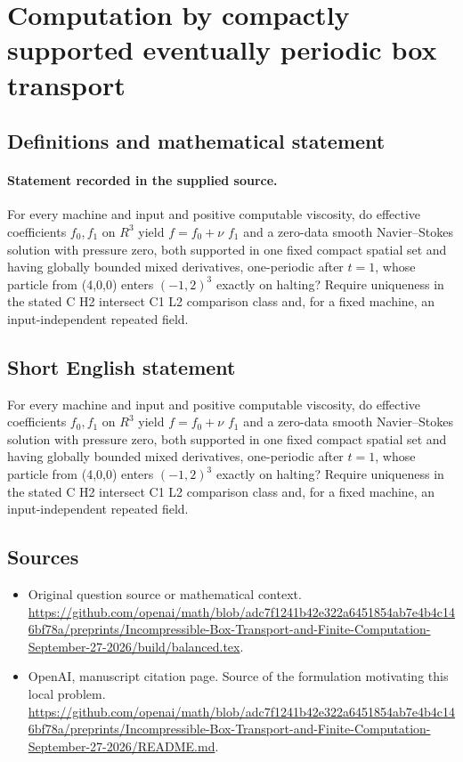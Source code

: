 \documentclass[11pt]{article}
\begin{document}
\section*{Computation by compactly supported eventually periodic box transport}\label{statement}
\subsection{Definitions and mathematical statement}
\paragraph{Statement recorded in the supplied source.}
For every machine and input and positive computable viscosity, do effective coefficients $f_0,f_1$ on $R^3$ yield $f=f_0+\nu $ $f_1$ and a zero-data smooth Navier–Stokes solution with pressure zero, both supported in one fixed compact spatial set and having globally bounded mixed derivatives, one-periodic after $t=1$, whose particle from (4,0,0) enters $(-1,2)^3$ exactly on halting? Require uniqueness in the stated C H2 intersect C1 L2 comparison class and, for a fixed machine, an input-independent repeated field.
\subsection{Short English statement}
For every machine and input and positive computable viscosity, do effective coefficients $f_0,f_1$ on $R^3$ yield $f=f_0+\nu $ $f_1$ and a zero-data smooth Navier–Stokes solution with pressure zero, both supported in one fixed compact spatial set and having globally bounded mixed derivatives, one-periodic after $t=1$, whose particle from (4,0,0) enters $(-1,2)^3$ exactly on halting? Require uniqueness in the stated C H2 intersect C1 L2 comparison class and, for a fixed machine, an input-independent repeated field.
\subsection{Sources}
\begin{itemize}
\item[S1] Original question source or mathematical context.
\url{https://github.com/openai/math/blob/adc7f1241b42e322a6451854ab7e4b4c146bf78a/preprints/Incompressible-Box-Transport-and-Finite-Computation-September-27-2026/build/balanced.tex}.
\item[S2] OpenAI, manuscript citation page. Source of the formulation motivating this local problem.
\url{https://github.com/openai/math/blob/adc7f1241b42e322a6451854ab7e4b4c146bf78a/preprints/Incompressible-Box-Transport-and-Finite-Computation-September-27-2026/README.md}.
\end{itemize}
\end{document}
